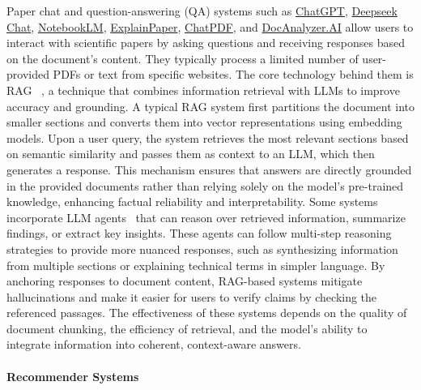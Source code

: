 Paper chat and question-answering (QA) systems such as \href{https://chatgpt.com/}{ChatGPT}, \href{https://chat.deepseek.com}{Deepseek Chat}, \href{https://notebooklm.google}{NotebookLM}, \href{https://www.explainpaper.com/}{ExplainPaper}, \href{https://www.chatpdf.com/}{ChatPDF}, and \href{https://docanalyzer.ai/}{DocAnalyzer.AI} allow users to interact with scientific papers by asking questions and receiving responses based on the document’s content. They typically process a limited number of user-provided PDFs or text from specific websites. The core technology behind them is RAG
~\cite{lewis2020retrieval, asai2024selfrag, kang-etal-2024-taxonomy}, a technique that combines information retrieval with LLMs
to improve accuracy and grounding. A typical RAG system first partitions the document into smaller sections and converts them into vector representations using embedding models. Upon a user query, the system retrieves the most relevant sections based on semantic similarity and passes them as context to an LLM, which then generates a response. This mechanism ensures that answers are directly grounded in the provided documents rather than relying solely on the model’s pre-trained knowledge, enhancing factual reliability and interpretability. Some systems incorporate LLM agents~\cite{tan-etal-2023-multi2claim, cai-etal-2024-mixgr,li-etal-2025-chatcite} that can reason over retrieved information, summarize findings, or extract key insights. These agents can follow multi-step reasoning strategies to provide more nuanced responses, such as synthesizing information from multiple sections or explaining technical terms in simpler language. By anchoring responses to document content, RAG-based systems mitigate hallucinations and make it easier for users to verify claims by checking the referenced passages. The effectiveness of these systems depends on the quality of document chunking, the efficiency of retrieval, and the model’s ability to integrate information into coherent, context-aware answers.

\paragraph{Recommender Systems} 

